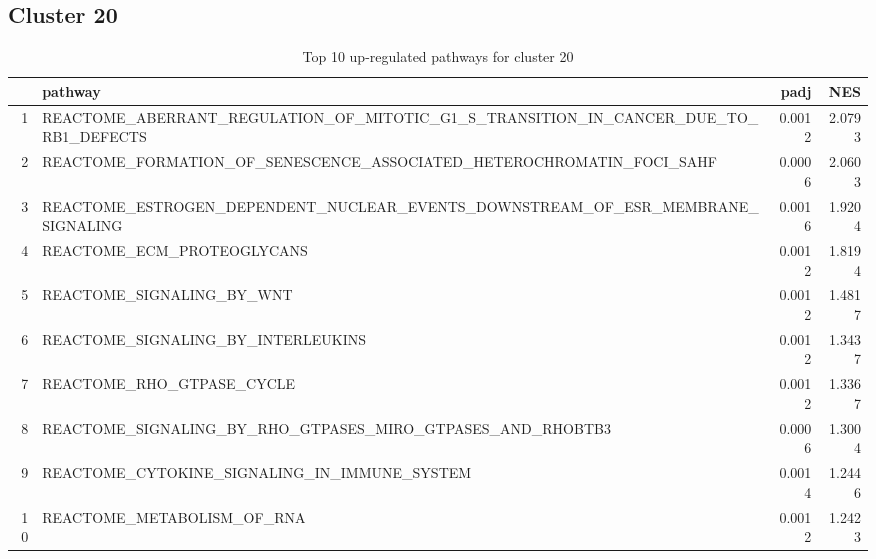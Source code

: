\documentclass{article}
\begin{document}
\subsection{Cluster 20 }
\begin{table}[H]
\centering
\begin{tabularx}{\textwidth}{rlrr}
  \hline
 & pathway & padj & NES \\ 
  \hline
1 & REACTOME\_ABERRANT\_REGULATION\_OF\_MITOTIC\_G1\_S\_TRANSITION\_IN\_CANCER\_DUE\_TO\_RB1\_DEFECTS & 0.0012 & 2.0793 \\ 
  2 & REACTOME\_FORMATION\_OF\_SENESCENCE\_ASSOCIATED\_HETEROCHROMATIN\_FOCI\_SAHF & 0.0006 & 2.0603 \\ 
  3 & REACTOME\_ESTROGEN\_DEPENDENT\_NUCLEAR\_EVENTS\_DOWNSTREAM\_OF\_ESR\_MEMBRANE\_SIGNALING & 0.0016 & 1.9204 \\ 
  4 & REACTOME\_ECM\_PROTEOGLYCANS & 0.0012 & 1.8194 \\ 
  5 & REACTOME\_SIGNALING\_BY\_WNT & 0.0012 & 1.4817 \\ 
  6 & REACTOME\_SIGNALING\_BY\_INTERLEUKINS & 0.0012 & 1.3437 \\ 
  7 & REACTOME\_RHO\_GTPASE\_CYCLE & 0.0012 & 1.3367 \\ 
  8 & REACTOME\_SIGNALING\_BY\_RHO\_GTPASES\_MIRO\_GTPASES\_AND\_RHOBTB3 & 0.0006 & 1.3004 \\ 
  9 & REACTOME\_CYTOKINE\_SIGNALING\_IN\_IMMUNE\_SYSTEM & 0.0014 & 1.2446 \\ 
  10 & REACTOME\_METABOLISM\_OF\_RNA & 0.0012 & 1.2423 \\ 
   \hline
\end{tabularx}
\caption{Top 10 up-regulated pathways for cluster 20} 
\label{tab:q3_2_20}
\end{table}
\end{document}
